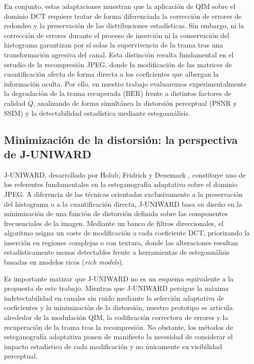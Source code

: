 \documentclass[IB]{TFUOC}%
\begin{document}
En conjunto, estas adaptaciones muestran que la aplicación de QIM sobre el dominio DCT requiere tratar de forma diferenciada la corrección de errores de redondeo y la preservación de las distribuciones estadísticas. Sin embargo, ni la corrección de errores durante el proceso de inserción ni la conservación del histograma garantizan por sí solas la supervivencia de la trama tras una transformación agresiva del canal. Esta distinción resulta fundamental en el estudio de la recompresión JPEG, donde la modificación de las matrices de cuantificación afecta de forma directa a los coeficientes que albergan la información oculta. Por ello, en nuestro trabajo evaluaremos experimentalmente la degradación de la trama recuperada ($\mathrm{BER}$) frente a distintos factores de calidad $Q$, analizando de forma simultánea la distorsión perceptual ($\mathrm{PSNR}$ y $\mathrm{SSIM}$) y la detectabilidad estadística mediante estegoanálisis.

\subsection{Minimización de la distorsión: la perspectiva de J-UNIWARD}

J-UNIWARD, desarrollado por Holub, Fridrich y Denemark \cite{17}, constituye uno de los referentes fundamentales en la esteganografía adaptativa sobre el dominio JPEG. A diferencia de las técnicas orientadas exclusivamente a la preservación del histograma o a la cuantificación directa, J-UNIWARD basa su diseño en la minimización de una función de distorsión definida sobre las componentes frecuenciales de la imagen. Mediante un banco de filtros direccionales, el algoritmo asigna un coste de modificación a cada coeficiente DCT, priorizando la inserción en regiones complejas o con textura, donde las alteraciones resultan estadísticamente menos detectables frente a herramientas de estegoanálisis basadas en modelos ricos (\textit{rich models}).

Es importante matizar que J-UNIWARD no es un esquema equivalente a la propuesta de este trabajo. Mientras que J-UNIWARD persigue la máxima indetectabilidad en canales sin ruido mediante la selección adaptativa de coeficientes y la minimización de la distorsión, nuestro prototipo se articula alrededor de la modulación QIM, la codificación correctora de errores y la recuperación de la trama tras la recompresión. No obstante, los métodos de esteganografía adaptativa ponen de manifiesto la necesidad de considerar el impacto estadístico de cada modificación y no únicamente su visibilidad perceptual.
\end{document}
